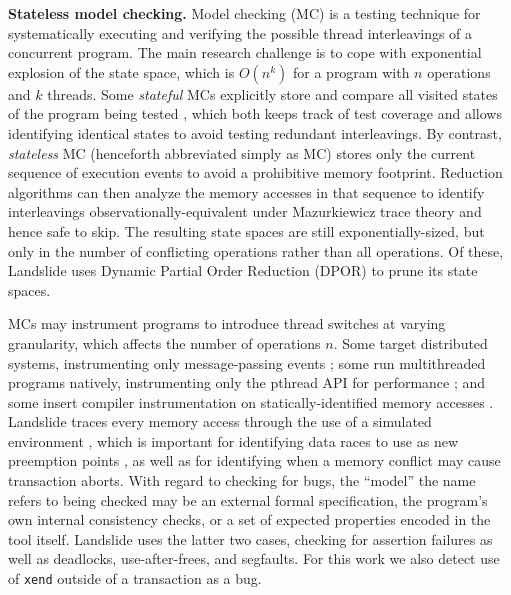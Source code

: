 \documentclass[10pt]{sigplanconf}
\begin{document}
{\bf Stateless model checking.}
Model checking (MC) \cite{verisoft} is a testing technique for systematically executing and verifying
the possible thread interleavings of a concurrent program.
The main research challenge is to cope with exponential explosion of the state space,
which is $O(n^k)$ for a program with $n$ operations and $k$ threads.
Some {\em stateful} MCs explicitly store and compare all visited states of the program being tested \cite{spin},
which both keeps track of test coverage
and allows identifying identical states to avoid testing redundant interleavings.
%
By contrast, {\em stateless} MC (henceforth abbreviated simply as MC)
stores only the current sequence of execution events to avoid a prohibitive memory footprint.
Reduction algorithms \cite{dpor,optimal-dpor,satcheck,mcr,mcr,tsopso}
can then analyze the memory accesses in that sequence to identify
interleavings observationally-equivalent under Mazurkiewicz trace theory \cite{mazurkiewicz} and hence safe to skip.
The resulting state spaces are still exponentially-sized,
but only in the number of conflicting operations rather than all operations.
Of these, Landslide uses Dynamic Partial Order Reduction (DPOR) \cite{dpor} to prune its state spaces.

MCs may instrument programs to introduce thread switches at varying granularity, which affects the number of operations $n$.
Some target distributed systems, instrumenting only message-passing events \cite{modist};
some run multithreaded programs natively, instrumenting only the pthread API for performance \cite{dbug-ssv};
and some insert compiler instrumentation on statically-identified memory accesses \cite{chess,inspect}.
Landslide traces every memory access through the use of a simulated environment \cite{bochs},
which is important for identifying data races to use as new preemption points \cite{quicksand},
as well as for identifying when a memory conflict may cause transaction aborts.
With regard to checking for bugs,
the ``model'' the name refers to being checked may be
an external formal specification,
the program's own internal consistency checks,
or a set of expected properties encoded in the tool itself.
Landslide uses the latter two cases, checking for assertion failures
as well as deadlocks, use-after-frees, and segfaults.
For this work we also detect use of {\tt xend} outside of a transaction as a bug.

\end{document}
